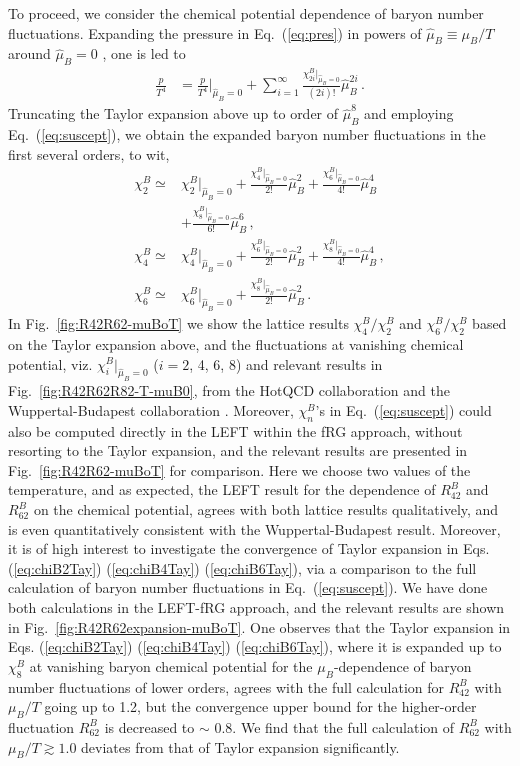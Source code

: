 \documentclass[%
reprint,
superscriptaddress,
showpacs,preprintnumbers,
 amsmath,amssymb,
 aps,
prd,
]{revtex4-1}
\def\Fig#1{Fig.~\ref{#1}} \def\Tab#1{Tab.~\ref{#1}}
\def\Eq#1{Eq.~(\ref{#1})}
\begin{document}
To proceed, we consider the chemical potential dependence of baryon number fluctuations. Expanding the pressure in \Eq{eq:pres} in powers of $\hat{\mu}_{B}\equiv\mu_B/T$ around $\hat{\mu}_{B}=0$ , one is led to 
%
\begin{align}
  \frac{p}{T^4}&=\frac{p}{T^4}\Big|_{\hat{\mu}_{B}=0}+\sum_{i=1}^{\infty}\frac{\chi^B_{2i}|_{\hat{\mu}_{B}=0}}{(2i)!}\hat{\mu}_{B}^{2i}\,.\label{eq:cmu}
\end{align}
%
Truncating the Taylor expansion above up to order of $\hat{\mu}_{B}^{8}$ and employing \Eq{eq:suscept}, we obtain the expanded baryon number fluctuations in the first several orders, to wit,
%
\begin{align}
\chi^B_2\simeq&\chi^B_2|_{\hat{\mu}_{B}=0}+\frac{\chi^B_4|_{\hat{\mu}_{B}=0}}{2!}\hat{\mu}_{B}^{2}+\frac{\chi^B_6|_{\hat{\mu}_{B}=0}}{4!}\hat{\mu}_{B}^{4}\nonumber\\[2ex]
&+\frac{\chi^B_8|_{\hat{\mu}_{B}=0}}{6!}\hat{\mu}_{B}^{6}\,,\label{eq:chiB2Tay}\\[2ex]
\chi^B_4\simeq&\chi^B_4|_{\hat{\mu}_{B}=0}+\frac{\chi^B_6|_{\hat{\mu}_{B}=0}}{2!}\hat{\mu}_{B}^{2}+\frac{\chi^B_8|_{\hat{\mu}_{B}=0}}{4!}\hat{\mu}_{B}^{4}\,,\label{eq:chiB4Tay}\\[2ex]
\chi^B_6\simeq&\chi^B_6|_{\hat{\mu}_{B}=0}+\frac{\chi^B_8|_{\hat{\mu}_{B}=0}}{2!}\hat{\mu}_{B}^{2}\,.\label{eq:chiB6Tay}
\end{align}
%
In \Fig{fig:R42R62-muBoT} we show the lattice results $\chi^B_4/\chi^B_2$ and $\chi^B_6/\chi^B_2$ based on the Taylor expansion above, and the fluctuations at vanishing chemical potential, viz. $\chi^B_{i}|_{\hat{\mu}_{B}=0}$ ($i=2$, 4, 6, 8) and relevant results in \Fig{fig:R42R62R82-T-muB0}, from the HotQCD collaboration \cite{Bazavov:2020bjn} and the Wuppertal-Budapest collaboration \cite{Borsanyi:2018grb}. Moreover, $\chi^B_n$'s in \Eq{eq:suscept} could also be computed directly in the LEFT within the fRG approach, without resorting to the Taylor expansion, and the relevant results are presented in \Fig{fig:R42R62-muBoT} for comparison. Here we choose two values of the temperature, and as expected, the LEFT result for the dependence of $R^{B}_{42}$ and $R^{B}_{62}$ on the chemical potential, agrees with both lattice results qualitatively, and is even quantitatively consistent with the Wuppertal-Budapest result. Moreover, it is of high interest to investigate the convergence of Taylor expansion in Eqs. (\ref{eq:chiB2Tay}) (\ref{eq:chiB4Tay}) (\ref{eq:chiB6Tay}), via a comparison to the full calculation of baryon number fluctuations in \Eq{eq:suscept}. We have done both calculations in the LEFT-fRG approach, and the relevant results are shown in \Fig{fig:R42R62expansion-muBoT}. One observes that the Taylor expansion in Eqs. (\ref{eq:chiB2Tay})  (\ref{eq:chiB4Tay})  (\ref{eq:chiB6Tay}), where it is expanded up to $\chi^B_8$ at vanishing baryon chemical potential for the $\mu_B$-dependence of baryon number fluctuations of lower orders, agrees with the full calculation for $R^{B}_{42}$ with $\mu_B/T$ going up to 1.2, but the convergence upper bound for the higher-order fluctuation $R^{B}_{62}$ is decreased to $\sim$ 0.8. We find that the full calculation of $R^{B}_{62}$ with $\mu_B/T \gtrsim 1.0$ deviates from that of Taylor expansion significantly.
\end{document}
